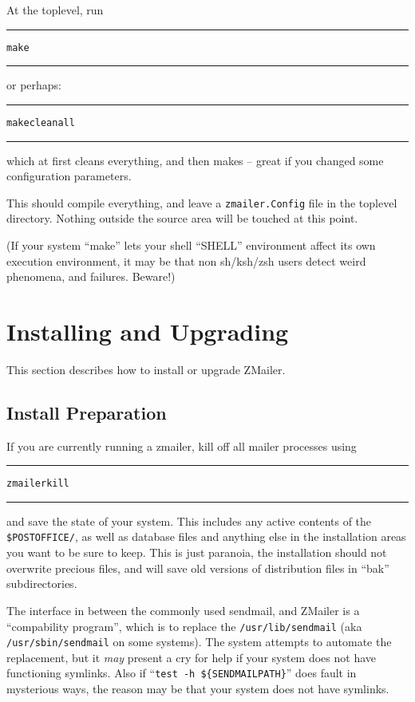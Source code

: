 At the toplevel, run
\nopagebreak
\begin{alltt}\medskip\hrule\medskip
  make
\medskip\hrule\medskip\end{alltt}

or perhaps:
\nopagebreak
\begin{alltt}\medskip\hrule\medskip
  make clean all
\medskip\hrule\medskip\end{alltt}

which at first cleans everything, and then makes -- great if you
changed some configuration parameters.

This should compile everything, and leave a \hfill{}
{\tt zmailer.Config} file in
the toplevel directory.  Nothing outside the source area will be
touched at this point.

(If your system ``make'' lets your shell ``SHELL'' environment
affect its own execution environment, it may be that non sh/ksh/zsh
users detect weird phenomena, and failures. Beware!)


\section{Installing and Upgrading}

This section describes how to install or upgrade ZMailer.


\subsection{Install Preparation}%
%

If you are currently running a zmailer, kill off all mailer processes
using
\begin{alltt}\medskip\hrule\medskip
  zmailer kill
\medskip\hrule\end{alltt}\medskip

and save the state of your system.  This includes any active
contents of the {\tt\$POSTOFFICE/}, as well as database files and
anything else in the installation areas you want to be sure
to keep.  This is just paranoia, the installation should not
overwrite precious files, and will save old versions of
distribution files in ``bak'' subdirectories.

The interface in between the commonly used sendmail, and ZMailer
is a ``compability program'', which is to replace the {\tt /usr/lib/sendmail}
(aka {\tt /usr/sbin/sendmail} on some systems).
The system attempts to automate the replacement, but it {\em may}
present a cry for help if your system does not have functioning symlinks.
Also if ``{\tt test -h \$\{SENDMAILPATH\}}'' does fault in mysterious ways,
the reason may be that your system does not have symlinks.

